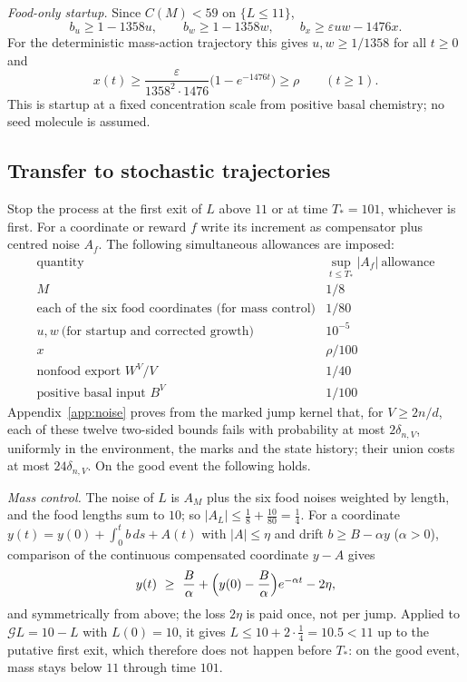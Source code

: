 \documentclass[11pt,letterpaper]{article}
\theoremstyle{plain}
\theoremstyle{definition}
\theoremstyle{remark}
\numberwithin{equation}{section}
\newcommand{\cG}{\mathcal G}
\newcommand{\eps}{\varepsilon}
\newcommand{\Bcoef}{B}
\begin{document}
\emph{Food-only startup.} Since $C(M)<59$ on $\{L\le11\}$,
\begin{equation}\label{eq:startupdrift}
 b_u\ge1-1358u,\qquad b_w\ge1-1358w,\qquad b_x\ge\eps uw-1476x .
\end{equation}
For the deterministic mass-action trajectory this gives $u,w\ge1/1358$ for all $t\ge0$ and
\[
 x(t)\ge\frac{\eps}{1358^2\cdot1476}\bigl(1-e^{-1476t}\bigr)\ge\rho\qquad(t\ge1).
\]
This is startup at a fixed concentration scale from positive basal chemistry; no seed molecule is assumed.

\subsection{Transfer to stochastic trajectories}\label{sec:transfer}
Stop the process at the first exit of $L$ above $11$ or at time $T_*=101$, whichever is first. For a coordinate or reward $f$ write its increment as compensator plus centred noise $A_f$. The following simultaneous allowances are imposed:
\begin{equation}\label{eq:allowances}
\begin{array}{l|c}
\text{quantity}&\sup_{t\le T_*}|A_f|\ \text{allowance}\\\hline
M&1/8\\
\text{each of the six food coordinates (for mass control)}&1/80\\
u,w\ \text{(for startup and corrected growth)}&10^{-5}\\
x&\rho/100\\
\text{nonfood export }W^V/V&1/40\\
\text{positive basal input }B^V&1/100
\end{array}
\end{equation}
Appendix~\ref{app:noise} proves from the marked jump kernel that, for $V\ge2n/d$, each of these twelve two-sided bounds fails with probability at most $2\delta_{n,V}$, uniformly in the environment, the marks and the state history; their union costs at most $24\delta_{n,V}$. On the good event the following holds.

\emph{Mass control.} The noise of $L$ is $A_M$ plus the six food noises weighted by length, and the food lengths sum to $10$; so $|A_L|\le\frac18+\frac{10}{80}=\frac14$. For a coordinate $y(t)=y(0)+\int_0^tb\,ds+A(t)$ with $|A|\le\eta$ and drift $b\ge\Bcoef-\alpha y$ ($\alpha>0$), comparison of the continuous compensated coordinate $y-A$ gives
\begin{equation}\label{eq:scalar}
 y(t)\ \ge\ \frac{\Bcoef}{\alpha}+\Bigl(y(0)-\frac{\Bcoef}{\alpha}\Bigr)e^{-\alpha t}-2\eta ,
\end{equation}
and symmetrically from above; the loss $2\eta$ is paid once, not per jump. Applied to $\cG L=10-L$ with $L(0)=10$, it gives $L\le10+2\cdot\frac14=10.5<11$ up to the putative first exit, which therefore does not happen before $T_*$: on the good event, mass stays below $11$ through time $101$.
\end{document}
